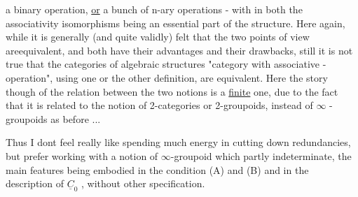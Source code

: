 a binary operation, \uline{or} a bunch of n-ary operations - with\hand{,} in both 
the associativity isomorphisms being an essential part of the structure.
Here again, while it is generally (and quite validly) felt that the
two points of view areequivalent, and both have their advantages and
their drawbacks, still it is not true that the  categories of algebraic
\margin{$\otimes$} structures "category with associative \hand{$\otimes$}-operation", using one or the
 other definition, are equivalent\hand{*}. Here the story though of the relation
between the two notions is a \uline{finite} one, due to the fact that it is
related to the notion of 2-categories or 2-groupoids, instead of $\infty$ -
groupoids as before ...

Thus I dont feel really like spending much energy in cutting down
redundancies, but prefer working with a notion of $\infty$-groupoid which 
partly indeterminate, the main features being embodied in the condition
(A) and (B) and in the description of $\underline{C}_0$ , without other specification.

